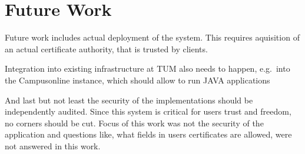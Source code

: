 









\chapter{Future Work}\label{ch:futureWork}

Future work includes actual deployment of the system.
This requires aquisition of an actual certificate authority, that is trusted by clients.

Integration into existing infrastructure at TUM also needs to happen, e.g.\ into the Campusonline instance, which should
allow to run JAVA applications

And last but not least the security of the implementations should be independently audited.
Since this system is critical for users trust and freedom, no corners should be cut.
Focus of this work was not the security of the application and questions like, what fields in users certificates are
allowed, were not answered in this work.
